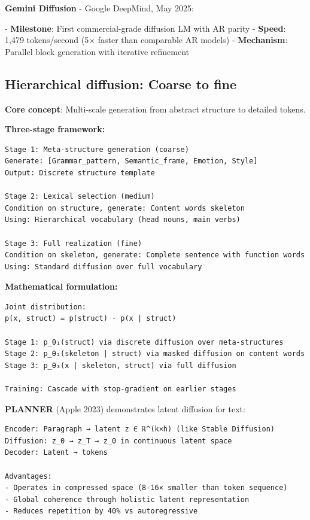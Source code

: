 \documentclass[11pt]{article}
\begin{document}
\textbf{Gemini Diffusion} - Google DeepMind, May 2025:

- \textbf{Milestone}: First commercial-grade diffusion LM with AR parity
- \textbf{Speed}: 1,479 tokens/second (5\(\times\) faster than comparable AR models)
- \textbf{Mechanism}: Parallel block generation with iterative refinement

\subsection{Hierarchical diffusion: Coarse to fine}

\textbf{Core concept}: Multi-scale generation from abstract structure to detailed tokens.

\textbf{Three-stage framework:}

\begin{verbatim}
Stage 1: Meta-structure generation (coarse)
Generate: [Grammar_pattern, Semantic_frame, Emotion, Style]
Output: Discrete structure template

Stage 2: Lexical selection (medium)
Condition on structure, generate: Content words skeleton
Using: Hierarchical vocabulary (head nouns, main verbs)

Stage 3: Full realization (fine)
Condition on skeleton, generate: Complete sentence with function words
Using: Standard diffusion over full vocabulary
\end{verbatim}

\textbf{Mathematical formulation:}

\begin{verbatim}
Joint distribution:
p(x, struct) = p(struct) · p(x | struct)

Stage 1: p_θ₁(struct) via discrete diffusion over meta-structures
Stage 2: p_θ₂(skeleton | struct) via masked diffusion on content words
Stage 3: p_θ₃(x | skeleton, struct) via full diffusion

Training: Cascade with stop-gradient on earlier stages
\end{verbatim}

\textbf{PLANNER} (Apple 2023) demonstrates latent diffusion for text:

\begin{verbatim}
Encoder: Paragraph → latent z ∈ ℝ^(k×h) (like Stable Diffusion)
Diffusion: z_0 → z_T → z_0 in continuous latent space
Decoder: Latent → tokens

Advantages:
- Operates in compressed space (8-16× smaller than token sequence)
- Global coherence through holistic latent representation
- Reduces repetition by 40% vs autoregressive
\end{verbatim}
\end{document}
